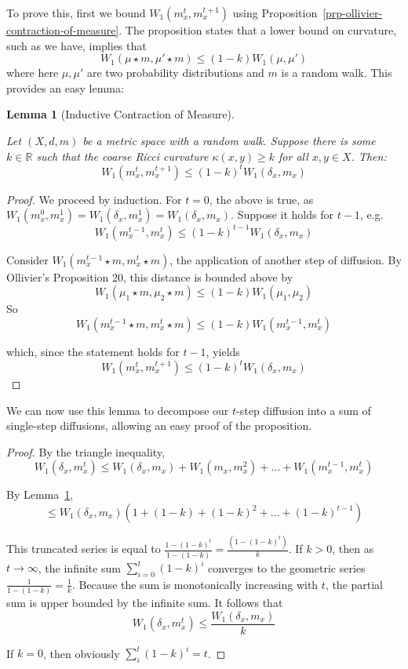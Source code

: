 \documentclass[
  letterpaper,
  DIV=11,
  numbers=noendperiod]{scrartcl}
\theoremstyle{plain}
\theoremstyle{plain}
\theoremstyle{definition}
\theoremstyle{plain}
\newtheorem{lemma}{Lemma}[section]
\theoremstyle{definition}
\theoremstyle{plain}
\theoremstyle{remark}
\begin{document}
To prove this, first we bound \(W_{1}(m_{x}^t,m_{x}^{t+1})\) using
Proposition~\ref{prp-ollivier-contraction-of-measure}. The proposition
states that a lower bound on curvature, such as we have, implies that \[
W_{1}(\mu \star m, \mu' \star m) \leq (1-k)W_{1}(\mu, \mu')
\] where here \(\mu,\mu'\) are two probability distributions and \(m\)
is a random walk. This provides an easy lemma:

\begin{lemma}[Inductive Contraction of
Measure]\protect\hypertarget{lem-inductive-contraction-of-measure}{}\label{lem-inductive-contraction-of-measure}

Let \((X,d,m)\) be a metric space with a random walk. Suppose there is
some \(k \in \mathbb{R}\) such that the coarse Ricci curvature
\(\kappa(x,y) \geq k\) for all \(x,y \in X\). Then: \[
W_1\left(m_x^t, m_x^{t+1}\right) \leq(1-k)^t W_1\left(\delta_x,m_x\right)
\]

\end{lemma}

\begin{proof}
We proceed by induction. For \(t=0\), the above is true, as
\(W_{1}(m_{x}^0, m_{x}^{1}) =W_{1}(\delta_x, m_{x}^{1}) = W_1\left(\delta_x,m_x\right)\).
Suppose it holds for \(t-1\), e.g. \[
W_1\left(m_x^{t-1}, m_x^{t}\right) \leq(1-k)^{t-1} W_1\left(\delta_x,m_x\right)
\]

Consider \(W_1\left(m_x^{t-1}\star m, m_x^{t}\star m\right)\), the
application of another step of diffusion. By Ollivier's Proposition 20,
this distance is bounded above by \[
W_1\left(\mu_1 \star m, \mu_2 \star m\right) \leq(1-k) W_1\left(\mu_1, \mu_2\right)
\] So \[
W_1\left(m_x^{t-1}\star m, m_x^{t}\star m\right) \leq  (1-k)W_1\left(m_x^{t-1}, m_x^{t}\right)
\]

which, since the statement holds for \(t-1\), yields \[
W_1\left(m_x^t, m_x^{t+1}\right) \leq(1-k)^t W_1\left(\delta_x,m_x\right)
\]
\end{proof}

We can now use this lemma to decompose our \(t\)-step diffusion into a
sum of single-step diffusions, allowing an easy proof of the
proposition.

\begin{proof}
By the triangle inequality, \[
W_{1}(\delta_{x},m_{x}^t) \leq W_1\left(\delta_x,m_x\right) + W_{1}(m_{x},m_{x}^2) + \dots + W_{1}(m_{x}^{t-1}, m_{x}^t)
\]

By Lemma~\ref{lem-inductive-contraction-of-measure}, \[
\leq W_1\left(\delta_x,m_x\right)\left(1+(1-k)+(1-k)^2+\ldots+(1-k)^{t-1}\right)
\]

This truncated series is equal to
\(\frac{1-(1-k)^t}{1-(1-k)} = \frac{(1-(1-k)^t)}{k}\). If \(k>0\), then
as \(t \to \infty\), the infinite sum \(\sum_{i=0}^t (1-k)^i\) converges
to the geometric series \(\frac{1}{1-(1-k)} = \frac{1}{k}\). Because the
sum is monotonically increasing with \(t\), the partial sum is upper
bounded by the infinite sum. It follows that \[
W_{1}(\delta_{x},m_{x}^t) \leq \frac{W_1\left(\delta_x,m_x\right)}{k}
\]

If \(k=0\), then obviously \(\sum_{i}^t (1-k)^i = t\).
\end{proof}
\end{document}
